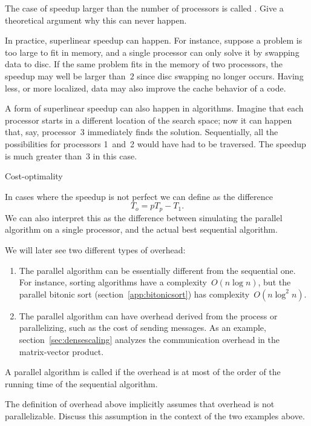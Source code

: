 \begin{exercise}
  The case of speedup larger than the number of processors is called
  . Give a theoretical argument why
  this can never happen.
\end{exercise}

In practice, superlinear speedup can happen. For instance, suppose a 
problem is too large to fit in memory, and a single processor can only
solve it by swapping data to disc. If the same problem fits in the
memory of two processors, the speedup may well be larger than~$2$
since disc swapping no longer occurs. Having less, or more localized,
data may also improve the cache behavior of a code.

A form of superlinear speedup can also happen in  algorithms.
Imagine that each processor starts in a different location of the search space;
now it can happen that, say, processor~3 immediately finds the solution.
Sequentially, all the possibilities for processors 1~and~2 would have had to be
traversed. The speedup is much greater than~3 in this case.

 {Cost-optimality}

In cases where the speedup is not perfect we can define
 as the difference \[ T_o = pT_p-T_1. \]
We can also interpret this as the difference between simulating the
parallel algorithm on a single processor, and the actual best
sequential algorithm.

We will later see two different types of overhead:
\begin{enumerate}
\item The parallel algorithm can be essentially different from the
  sequential one. For instance, sorting algorithms have a
  complexity~$O(n\log n)$, but the parallel bitonic sort
  (section~\ref{app:bitonicsort}) has complexity~$O(n\log^2n)$.
\item The parallel algorithm can have overhead derived from the
  process or parallelizing, such as the cost of sending messages. As
  an example, section~\ref{sec:densescaling} analyzes the
  communication overhead in the matrix-vector product.
\end{enumerate}

A parallel algorithm is called  if the
overhead is at most of the order of the running time of the sequential
algorithm.

\begin{exercise}
  The definition of overhead above implicitly assumes that overhead is
  not parallelizable. Discuss this assumption in the context of the
  two examples above.
\end{exercise}

